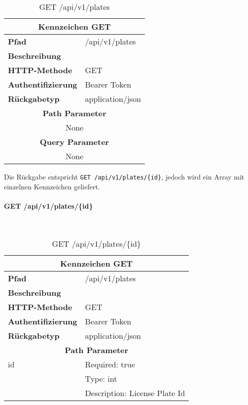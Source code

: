 \begin{table}[H]
  \centering
  \begin{tabular}{|l|l|}
  \hline
  \multicolumn{2}{|c|}{\textbf{Kennzeichen GET}} \\ \hline
  \textbf{Pfad}                & /api/v1/plates  \\ \hline
  \textbf{Beschreibung}        &                     \\ \hline
  \textbf{HTTP-Methode}        & GET                 \\ \hline
  \textbf{Authentifizierung}   & Bearer Token        \\ \hline
  \textbf{Rückgabetyp}         & application/json    \\ \hline
  \multicolumn{2}{|c|}{\textbf{Path Parameter}}                      \\ \hline
  \multicolumn{2}{|c|}{None}          \\ \hline
  \multicolumn{2}{|c|}{\textbf{Query Parameter}}                      \\ \hline
  \multicolumn{2}{|c|}{None}          \\ \hline
  \end{tabular}
  \caption{GET /api/v1/plates}
\end{table}

Die Rückgabe entspricht \verb|GET /api/v1/plates/{id}|, jedoch wird ein
Array mit einzelnen Kennzeichen geliefert.

\paragraph{GET /api/v1/plates/\{id\}}\mbox{}\\

\begin{table}[H]
  \centering
  \begin{tabular}{|l|l|}
  \hline
  \multicolumn{2}{|c|}{\textbf{Kennzeichen GET}}         \\ \hline
  \textbf{Pfad}              & /api/v1/plates        \\ \hline
  \textbf{Beschreibung}      &                           \\ \hline
  \textbf{HTTP-Methode}      & GET                       \\ \hline
  \textbf{Authentifizierung} & Bearer Token              \\ \hline
  \textbf{Rückgabetyp}       & application/json          \\ \hline
  \multicolumn{2}{|c|}{\textbf{Path Parameter}}          \\ \hline
  id                         & Required: true            \\ \hline
                             & Type: int                 \\ \hline
                             & Description: License Plate Id \\ \hline
  \end{tabular}
  \caption{GET /api/v1/plates/\{id\}}
\end{table}

